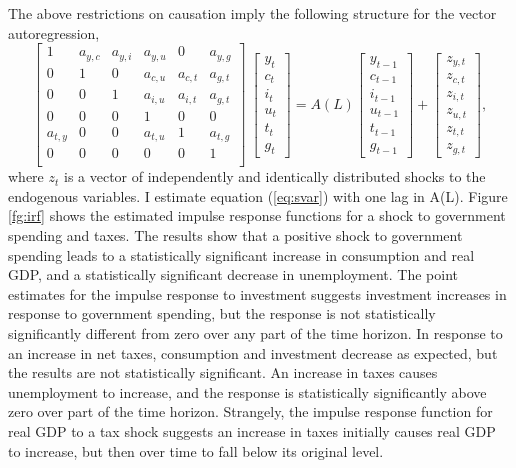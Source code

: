 \documentclass[12pt]{article}
\newcommand{\beq}{\begin{equation}}
\newcommand{\eeq}{\end{equation}}
\begin{document}
The above restrictions on causation imply the following structure for the vector autoregression,
\beq \label{eq:svar} \left[ \begin{array}{cccccc} 
     1 & a_{y,c} & a_{y,i} & a_{y,u} & 0 & a_{y,g} \\
     0 & 1 & 0 & a_{c,u} & a_{c,t} & a_{g,t} \\ 
     0 & 0 & 1 & a_{i,u} & a_{i,t} & a_{g,t} \\
     0 & 0 & 0 & 1 & 0 & 0 \\
     a_{t,y} & 0 & 0 & a_{t,u} & 1 & a_{t,g} \\
     0 & 0 & 0 & 0 & 0 & 1 \\ \end{array} \right]~ 
     \left[ \begin{array}{c} y_t \\ c_t \\ i_t \\ u_t \\ t_t \\ g_t \end{array} \right]  = 
     A(L) \left[ \begin{array}{c} y_{t-1} \\ c_{t-1} \\ i_{t-1} \\ u_{t-1} \\ t_{t-1} \\ g_{t-1} \end{array} \right] +
     \left[ \begin{array}{c} z_{y,t} \\ z_{c,t} \\ z_{i,t} \\ z_{u,t} \\ z_{t,t} \\ z_{g,t} \end{array} \right],
\eeq 
where $z_{t}$ is a vector of independently and identically distributed shocks to the endogenous variables.  I estimate equation (\ref{eq:svar}) with one lag in A(L).  Figure \ref{fg:irf} shows the estimated impulse response functions for a shock to government spending and taxes.  The results show that a positive shock to government spending leads to a statistically significant increase in consumption and real GDP, and a statistically significant decrease in unemployment.  The point estimates for the impulse response to investment suggests investment increases in response to government spending, but the response is not statistically significantly different from zero over any part of the time horizon.  In response to an increase in net taxes, consumption and investment decrease as expected, but the results are not statistically significant.  An increase in taxes causes unemployment to increase, and the response is statistically significantly above zero over part of the time horizon.  Strangely, the impulse response function for real GDP to a tax shock suggests an increase in taxes initially causes real GDP to increase, but then over time to fall below its original level. 
\end{document}
